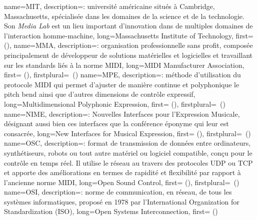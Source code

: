 {
    name={MIT},
    description={\textit{}: université américaine situés à Cambridge, Massachusetts, spécialisée dans les domaines de la science et de la technologie. Son \textit{Media Lab} est un lieu important d'innovation dans de multiples domaines de l'interaction homme-machine},
    long={Massachusetts Institute of Technology},
    first={} (),
}
{
    name={MMA},
    description={\textit{}: organisation professionnelle sans profit, composée principalement de développeur de solutions matérielles et logicielles et travaillant sur les standards liés à la norme MIDI},
    long={MIDI Manufacturer Association},
    first={} (),
    firstplural={\glspluralsuffix\ (\glspluralsuffix)}
}
{
    name={MPE},
    description={\textit{}: méthode d'utilisation du protocole MIDI qui permet d'ajuster de manière continue et polyphonique le pitch bend ainsi que d'autres dimensions de contrôle expressif},
    long={Multidimensional Polyphonic Expression},
   	first={} (),
    firstplural={\glspluralsuffix\ (\glspluralsuffix)}
}
{
    name={NIME},
    description={\textit{}: Nouvelles Interfaces pour l'Expression Musicale, désignant aussi bien ces interfaces que la conférence éponyme qui leur est consacrée},
    long={New Interfaces for Musical Expression},
    first={} (),
    firstplural={\glspluralsuffix\ (\glspluralsuffix)}
}
{
    name={OSC},
    description={\textit{}: format de transmission de données entre ordinateurs, synthétiseurs, robots ou tout autre matériel ou logiciel compatible, conçu pour le contrôle en temps réel. Il utilise le réseau au travers des protocoles \gls{UDP} ou \gls{TCP} et apporte des améliorations en termes de rapidité et flexibilité par rapport à l'ancienne norme MIDI},
    long={Open Sound Control},
    first={} (),
    firstplural={\glspluralsuffix\ (\glspluralsuffix)}
}
{
    name={OSI},
    description={\textit{}: norme de communication, en réseau, de tous les systèmes informatiques, proposé en 1978 par l'International Organization for Standardization (ISO)},
    long={Open Systems Interconnection},
    first={ ()}
}
